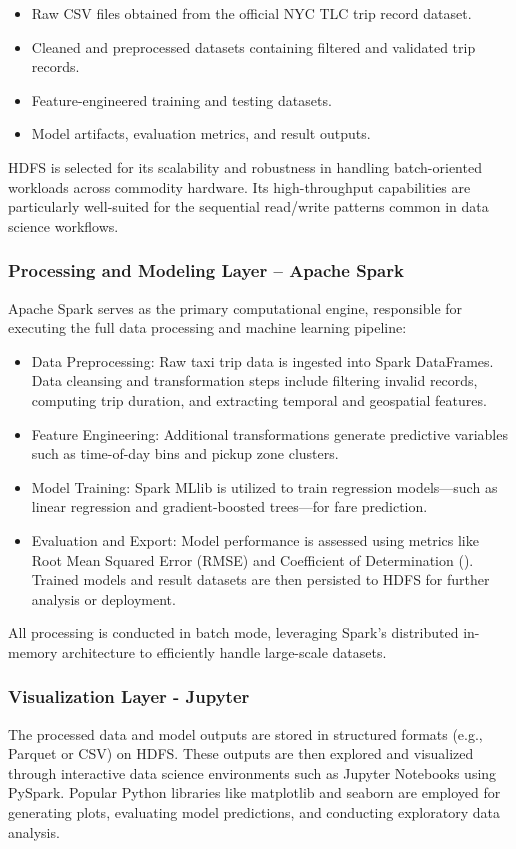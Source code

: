 \documentclass[conference]{IEEEtran}
\begin{document}
\begin{itemize}
  \item Raw CSV files obtained from the official NYC TLC trip record dataset.
  \item Cleaned and preprocessed datasets containing filtered and validated trip records.
  \item Feature-engineered training and testing datasets.
  \item Model artifacts, evaluation metrics, and result outputs.
\end{itemize}

HDFS is selected for its scalability and robustness in handling batch-oriented workloads across commodity hardware. Its high-throughput capabilities are particularly well-suited for the sequential read/write patterns common in data science workflows.

\subsubsection{Processing and Modeling Layer – Apache Spark}
Apache Spark serves as the primary computational engine, responsible for executing the full data processing and machine learning pipeline:
\begin{itemize}
  \item Data Preprocessing: Raw taxi trip data is ingested into Spark DataFrames. Data cleansing and transformation steps include filtering invalid records, computing trip duration, and extracting temporal and geospatial features.
  \item Feature Engineering: Additional transformations generate predictive variables such as time-of-day bins and pickup zone clusters.
  \item Model Training: Spark MLlib is utilized to train regression models—such as linear regression and gradient-boosted trees—for fare prediction.
  \item Evaluation and Export: Model performance is assessed using metrics like Root Mean Squared Error (RMSE) and Coefficient of Determination (). Trained models and result datasets are then persisted to HDFS for further analysis or deployment.
\end{itemize}

All processing is conducted in batch mode, leveraging Spark’s distributed in-memory architecture to efficiently handle large-scale datasets.

\subsubsection{Visualization Layer - Jupyter}
The processed data and model outputs are stored in structured formats (e.g., Parquet or CSV) on HDFS. These outputs are then explored and visualized through interactive data science environments such as Jupyter Notebooks using PySpark. Popular Python libraries like matplotlib and seaborn are employed for generating plots, evaluating model predictions, and conducting exploratory data analysis.
\end{document}
